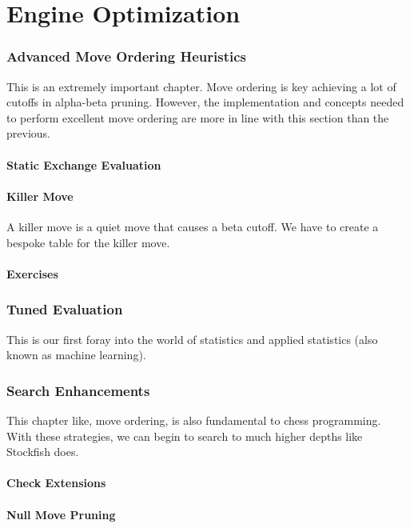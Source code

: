 \documentclass[letterpaper,11pt]{article}
\begin{document}
\newpage
\part{Engine Optimization}

\section{Advanced Move Ordering Heuristics}

This is an extremely important chapter.
Move ordering is key achieving a lot of cutoffs in alpha-beta pruning. 
However, the implementation and concepts needed to perform
excellent move ordering are more in line with this section than the previous.

\subsection{Static Exchange Evaluation}
\subsection{Killer Move}
A killer move is a quiet move that causes a beta cutoff.
We have to create a bespoke table for the killer move.
\subsection{Exercises}


\section{Tuned Evaluation}

This is our first foray into the world of statistics and applied statistics (also known as machine learning).

\section{Search Enhancements}

This chapter like, move ordering, is also fundamental to chess programming. With these strategies, 
we can begin to search to much higher depths like Stockfish does.

\subsection{Check Extensions}
\subsection{Null Move Pruning}
\end{document}
